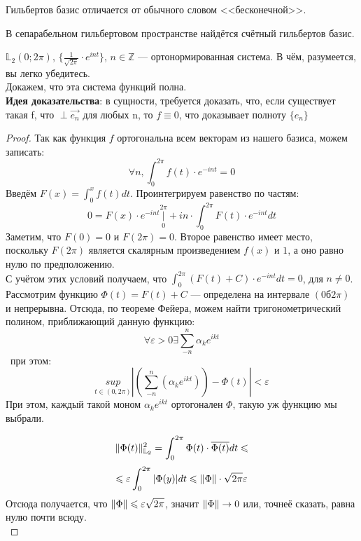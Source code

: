 	{\color{gray} Гильбертов базис отличается от обычного словом <<бесконечной>>.}
	
	\begin{state}
		В сепарабельном гильбертовом пространстве найдётся счётный гильбертов базис.
	\end{state}
	
	\example $\mathbb{L}_2 (0; 2\pi)$, $\{ \frac{1}{\sqrt{2\pi}} \cdot e^{int} \}$, $n \in \mathbb{Z}$ --- ортонормированная система.
	{\color{gray} В чём, разумеется, вы легко убедитесь.}\\
	Докажем, что эта система функций полна.\\
	\textbf{Идея доказательства}: в сущности, требуется доказать, что, если существует такая f, что $\perp \vec{e_n}$
	для любых n, то $f \equiv 0$, что доказывает полноту $\{ e_n \}$
	\begin{proof}
		Так как функция $f$ ортогональна всем векторам из нашего базиса, можем записать:
		$$ \forall n, \int_0^{2\pi} f(t) \cdot e^{-int} = 0 $$
		Введём $F(x) = \int_0^x f(t) dt$. Проинтегрируем равенство по частям:
		$$ 0 = F(x) \cdot e^{-int} \underset{0}{\overset{{2\pi}}{|}} + i n \cdot \int_0^{2\pi} F(t) \cdot e^{-int} dt $$
		Заметим, что $F(0) = 0$ и $F(2\pi) = 0$. Второе равенство имеет место, поскольку $F(2\pi)$ является 
        скалярным произведением $f(x)$ и $1$, а оно равно нулю по предположению. \\
		С учётом этих условий получаем, что $\int_0^{2\pi} (F(t) + C) \cdot e^{-int} dt = 0$, для $n \neq 0$. \\
		Рассмотрим функцию $\Phi(t) = F(t) + C$ --- определена на интервале $(0б 2\pi)$ и непрерывна.
		Отсюда, по теореме Фейера, можем найти тригонометрический полином, приближающий данную функцию:
		$$\forall \varepsilon > 0 \exists \sum_{-n}^n \alpha_k e^{ikt}$$\
		при этом:
		$$ \underset{t \in (0,2\pi)}{sup} | (\sum_{-n}^n (\alpha_k e^{ikt})) - \Phi(t)| < \varepsilon $$
		При этом, каждый такой моном $\alpha_k e^{ikt}$ ортогонален $\Phi$, такую уж функцию мы выбрали.
		
		$$ \| \Phi(t) \|^2_{\mathbb{L}_2} = \int_0^{2\pi} \Phi(t) \cdot \overline{\Phi(t)} dt \leqslant $$
		$$ \leqslant \varepsilon \int_0^{2\pi} | \Phi(y) | dt \leqslant \| \Phi \| \cdot \sqrt{2\pi} \varepsilon $$
		Отсюда получается, что $\| \Phi \| \leqslant \varepsilon \sqrt{2\pi}$, значит $\| \Phi \| \rightarrow 0$ или, точнеё сказать,
		равна нулю почти всюду.\\
	\end{proof}
	
